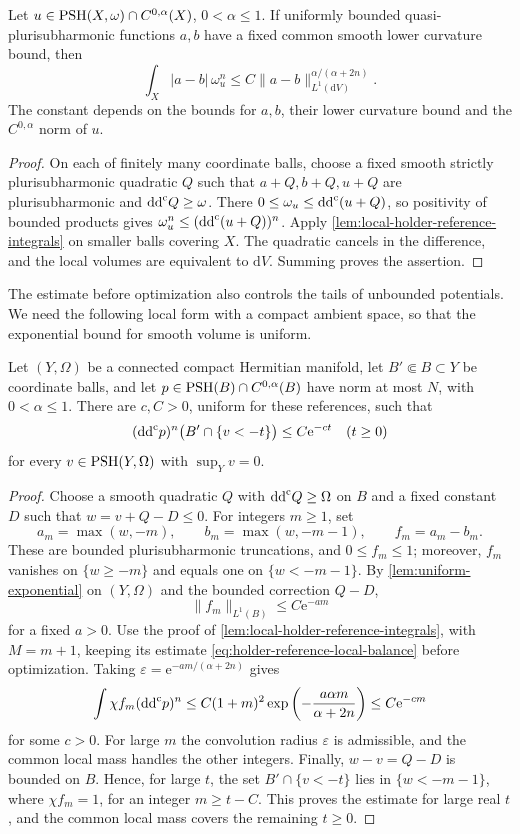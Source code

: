 \begin{corollary}\label{cor:holder-reference-weighted-modulus}
Let $u\in\mathrm{PSH}(X,\omega)\cap C^{0,\alpha}(X)$, $0<\alpha\leq1$. If uniformly bounded quasi-plurisubharmonic functions $a,b$ have a fixed common smooth lower curvature bound, then
\[
 \int_X|a-b|\,\omega_u^n
 \leq C\|a-b\|_{L^1(\mathrm dV)}^{\alpha/(\alpha+2n)}.
\]
The constant depends on the bounds for $a,b$, their lower curvature bound and the $C^{0,\alpha}$ norm of $u$.
\end{corollary}
\begin{proof}
On each of finitely many coordinate balls, choose a fixed smooth strictly plurisubharmonic quadratic $Q$ such that $a+Q,b+Q,u+Q$ are plurisubharmonic and $\mathrm{dd}^{\mathrm{c}} Q\geq\omega$. There
$0\leq\omega_u\leq\mathrm{dd}^{\mathrm{c}}(u+Q)$, so positivity of bounded products gives $\omega_u^n\leq(\mathrm{dd}^{\mathrm{c}}(u+Q))^n$. Apply \cref{lem:local-holder-reference-integrals} on smaller balls covering $X$. The quadratic cancels in the difference, and the local volumes are equivalent to $\mathrm dV$. Summing proves the assertion.
\end{proof}

The estimate before optimization also controls the tails of unbounded potentials. We need the following local form with a compact ambient space, so that the exponential bound for smooth volume is uniform.

\begin{lemma}\label{lem:local-holder-exponential-tails}
Let $(Y,\Omega)$ be a connected compact Hermitian manifold, let $B'\Subset B\subset Y$ be coordinate balls, and let $p\in\mathrm{PSH}(B)\cap C^{0,\alpha}(B)$ have norm at most $N$, with $0<\alpha\leq1$. There are $c,C>0$, uniform for these references, such that
\[
 (\mathrm{dd}^{\mathrm{c}} p)^n\bigl(B'\cap\{v<-t\}\bigr)\leq C\mathrm e^{-ct}
 \quad(t\geq0)
\]
for every $v\in\mathrm{PSH}(Y,\Omega)$ with $\sup_Yv=0$.
\end{lemma}
\begin{proof}
Choose a smooth quadratic $Q$ with $\mathrm{dd}^{\mathrm{c}} Q\geq\Omega$ on $B$ and a fixed constant $D$ such that $w=v+Q-D\leq0$. For integers $m\geq1$, set
\[
 a_m=\max(w,-m),\qquad b_m=\max(w,-m-1),\qquad f_m=a_m-b_m.
\]
These are bounded plurisubharmonic truncations, and $0\leq f_m\leq1$; moreover, $f_m$ vanishes on $\{w\geq-m\}$ and equals one on $\{w<-m-1\}$. By \cref{lem:uniform-exponential} on $(Y,\Omega)$ and the bounded correction $Q-D$,
\[
 \|f_m\|_{L^1(B)}\leq C\mathrm e^{-am}
\]
for a fixed $a>0$. Use the proof of \cref{lem:local-holder-reference-integrals}, with $M=m+1$, keeping its estimate \eqref{eq:holder-reference-local-balance} before optimization. Taking $\varepsilon=\mathrm e^{-am/(\alpha+2n)}$ gives
\[
 \int\chi f_m(\mathrm{dd}^{\mathrm{c}} p)^n
 \leq C(1+m)^2\exp\left(-\frac{a\alpha m}{\alpha+2n}\right)
 \leq C\mathrm e^{-cm}
\]
for some $c>0$. For large $m$ the convolution radius $\varepsilon$ is admissible, and the common local mass handles the other integers. Finally, $w-v=Q-D$ is bounded on $B$. Hence, for large $t$, the set $B'\cap\{v<-t\}$ lies in $\{w<-m-1\}$, where $\chi f_m=1$, for an integer $m\geq t-C$. This proves the estimate for large real $t$, and the common local mass covers the remaining $t\geq0$.
\end{proof}
